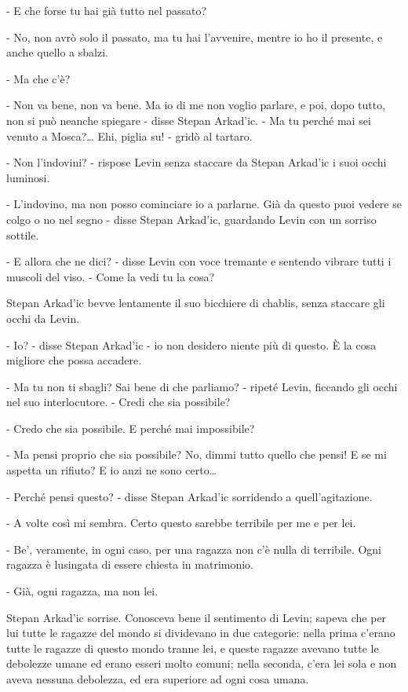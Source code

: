 - E che forse tu hai già tutto nel passato? 

- No, non avrò solo il passato, ma tu hai l'avvenire, mentre io ho il presente, e anche quello a sbalzi. 

- Ma che c'è? 

- Non va bene, non va bene. Ma io di me non voglio parlare, e poi, dopo tutto, non si può neanche spiegare - disse Stepan Arkad'ic. - Ma tu perché mai sei venuto a Mosca?\ldots{} Ehi, piglia su! - gridò al tartaro. 

- Non l'indovini? - rispose Levin senza staccare da Stepan Arkad'ic i suoi occhi luminosi. 

- L'indovino, ma non posso cominciare io a parlarne. Già da questo puoi vedere se colgo o no nel segno - disse Stepan Arkad'ic, guardando Levin con un sorriso sottile. 

- E allora che ne dici? - disse Levin con voce tremante e sentendo vibrare tutti i muscoli del viso. - Come la vedi tu la cosa? 

Stepan Arkad'ic bevve lentamente il suo bicchiere di chablis, senza staccare gli occhi da Levin. 

- Io? - disse Stepan Arkad'ic - io non desidero niente più di questo. È la cosa migliore che possa accadere. 

- Ma tu non ti sbagli? Sai bene di che parliamo? - ripeté Levin, ficcando gli occhi nel suo interlocutore. - Credi che sia possibile? 

- Credo che sia possibile. E perché mai impossibile? 

- Ma pensi proprio che sia possibile? No, dimmi tutto quello che pensi! E se mi aspetta un rifiuto? E io anzi ne sono certo\ldots{} 

- Perché pensi questo? - disse Stepan Arkad'ic sorridendo a quell'agitazione. 

- A volte così mi sembra. Certo questo sarebbe terribile per me e per lei. 

- Be', veramente, in ogni caso, per una ragazza non c'è nulla di terribile. Ogni ragazza è lusingata di essere chiesta in matrimonio. 

- Già, ogni ragazza, ma non lei. 

Stepan Arkad'ic sorrise. Conosceva bene il sentimento di Levin; sapeva che per lui tutte le ragazze del mondo si dividevano in due categorie: nella prima c'erano tutte le ragazze di questo mondo tranne lei, e queste ragazze avevano tutte le debolezze umane ed erano esseri molto comuni; nella seconda, c'era lei sola e non aveva nessuna debolezza, ed era superiore ad ogni cosa umana. 

